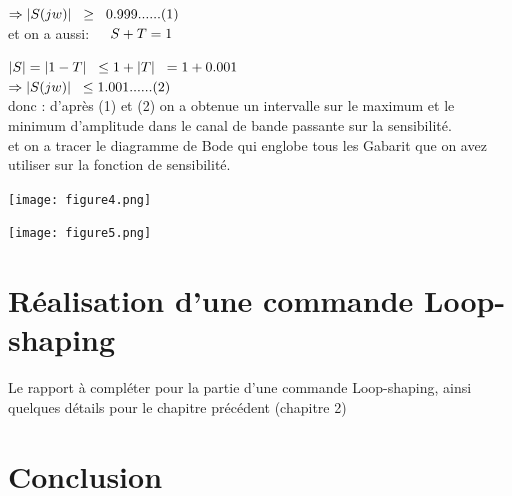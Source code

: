 \documentclass[12pt, a4paper, openany]{report}
\begin{document}
$\Rightarrow |S(jw)|\hspace{0.2cm}\geq\hspace{0.2cm}0.999 ......(1)$ \\

et on a aussi: $\hspace{0.2cm} \hspace{0.2cm} S+T=1 $ 

$ |S|=|1-T|\hspace{0.2cm} \leq 1 +|T|\hspace{0.2cm}=1+0.001 $\\

$\Rightarrow |S(jw)|\hspace{0.2cm}\leq 1.001 ......(2) $ \\

donc : d'après (1) et (2) on a obtenue un intervalle sur le maximum et le minimum d'amplitude dans le canal de bande passante sur la sensibilité. \\

et on a tracer le diagramme de Bode qui englobe tous les Gabarit que on avez utiliser sur la fonction de sensibilité.   
\begin{center}
 \texttt{[image: figure4.png]}
   \label{fig1}
   \end{center}
   
   \begin{center}
    \texttt{[image: figure5.png]}
    \label{fig1}
   \end{center}



\chapter{Réalisation d'une commande Loop-shaping }
 
 Le rapport à compléter pour la partie d'une commande Loop-shaping, ainsi quelques détails pour le chapitre précédent (chapitre 2)   


\chapter*{Conclusion}
\end{document}
